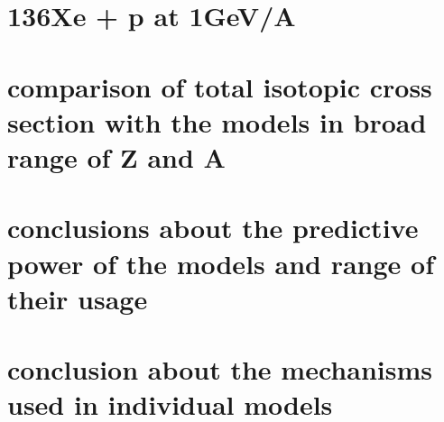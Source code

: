 \section{136Xe + p at 1GeV/A}
\section{comparison of total isotopic cross section with the models in broad range of Z and A}
\section{conclusions about the predictive power of the models and range of their usage}
\section{conclusion about the mechanisms used in individual models}